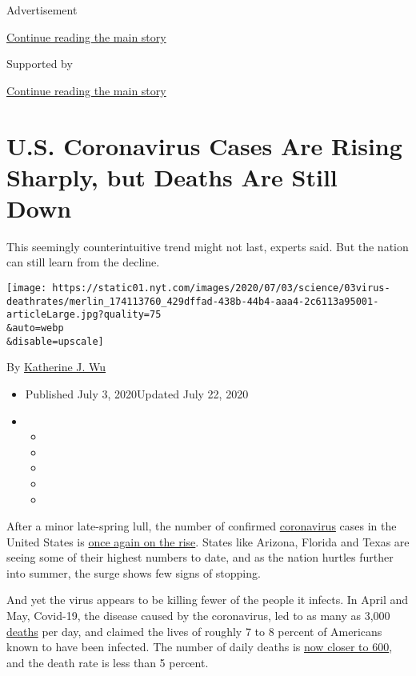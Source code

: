 Advertisement

\protect\hyperlink{after-top}{Continue reading the main story}

Supported by

\protect\hyperlink{after-sponsor}{Continue reading the main story}

\hypertarget{us-coronavirus-cases-are-rising-sharply-but-deaths-are-still-down}{%
\section{U.S. Coronavirus Cases Are Rising Sharply, but Deaths Are Still
Down}\label{us-coronavirus-cases-are-rising-sharply-but-deaths-are-still-down}}

This seemingly counterintuitive trend might not last, experts said. But
the nation can still learn from the decline.

\texttt{[image: https://static01.nyt.com/images/2020/07/03/science/03virus-deathrates/merlin\_174113760\_429dffad-438b-44b4-aaa4-2c6113a95001-articleLarge.jpg?quality=75\\\&auto=webp\\\&disable=upscale]}

By \href{https://www.nytimes.com/by/katherine-j--wu}{Katherine J. Wu}

\begin{itemize}
\item
  Published July 3, 2020Updated July 22, 2020
\item
  \begin{itemize}
  \item
  \item
  \item
  \item
  \item
  \end{itemize}
\end{itemize}

After a minor late-spring lull, the number of confirmed
\href{https://www.nytimes.com/2020/07/22/us/florida-mother-2-children-covid-19.html}{coronavirus}
cases in the United States is
\href{https://www.nytimes.com/interactive/2020/us/coronavirus-us-cases.html}{once
again on the rise}. States like Arizona, Florida and Texas are seeing
some of their highest numbers to date, and as the nation hurtles further
into summer, the surge shows few signs of stopping.

And yet the virus appears to be killing fewer of the people it infects.
In April and May, Covid-19, the disease caused by the coronavirus, led
to as many as 3,000
\href{https://www.nytimes.com/2020/07/22/us/florida-mother-2-children-covid-19.html}{deaths}
per day, and claimed the lives of roughly 7 to 8 percent of Americans
known to have been infected. The number of daily deaths is
\href{https://www.nytimes.com/2020/07/02/briefing/coronavirus-jobs-numbers-joe-biden-your-thursday-briefing.html}{now
closer to 600}, and the death rate is less than 5 percent.


